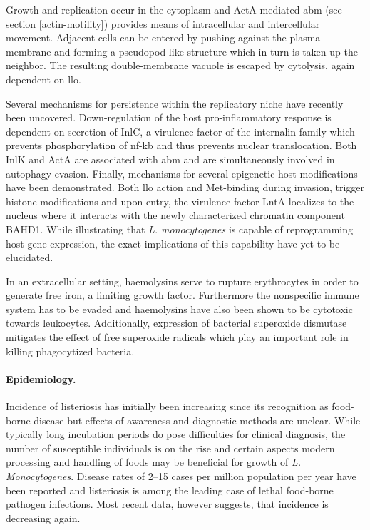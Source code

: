Growth and replication occur in the cytoplasm and ActA mediated \gls{abm} (see section \ref{actin-motility}) provides means of intracellular and intercellular movement. Adjacent cells can be entered by pushing against the plasma membrane and forming a pseudopod-like structure which in turn is taken up the neighbor. The resulting double-membrane vacuole is escaped by cytolysis, again dependent on \gls{llo}.

Several mechanisms for persistence within the replicatory niche have recently been uncovered. Down-regulation of the host pro-inflammatory response is dependent on secretion of InlC, a virulence factor of the internalin family which prevents phosphorylation of \gls{nf-kb} and thus prevents nuclear translocation. Both InlK and ActA are associated with \gls{abm} and are simultaneously involved in autophagy evasion. Finally, mechanisms for several epigenetic host modifications have been demonstrated. Both \gls{llo} action and Met-binding during invasion, trigger histone modifications and upon entry, the virulence factor LntA localizes to the nucleus where it interacts with the newly characterized chromatin component BAHD1. While illustrating that \textit{L. monocytogenes} is capable of reprogramming host gene expression, the exact implications of this capability have yet to be elucidated.

In an extracellular setting, haemolysins serve to rupture erythrocytes in order to generate free iron, a limiting growth factor. Furthermore the nonspecific immune system has to be evaded and haemolysins have also been shown to be cytotoxic towards leukocytes. Additionally, expression of bacterial superoxide dismutase mitigates the effect of free superoxide radicals which play an important role in killing phagocytized bacteria.

\paragraph{Epidemiology.}
Incidence of listeriosis has initially been increasing since its recognition as food-borne disease but effects of awareness and diagnostic methods are unclear. While typically long incubation periods do pose difficulties for clinical diagnosis, the number of susceptible individuals is on the rise and certain aspects modern processing and handling of foods may be beneficial for growth of \textit{L. Monocytogenes}. Disease rates of 2--15 cases per million population per year have been reported and listeriosis is among the leading case of lethal food-borne pathogen infections. Most recent data, however suggests, that incidence is decreasing again.

